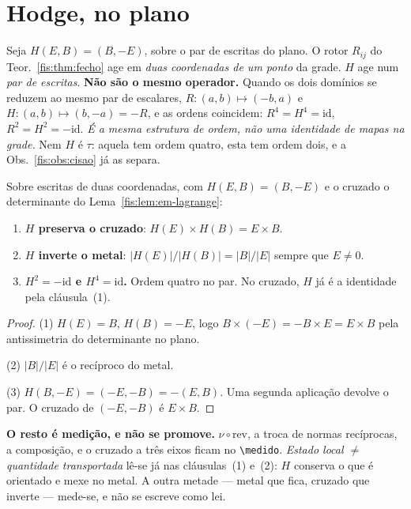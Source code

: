 \documentclass[livro.tex]{subfiles}
\begin{document}
\section{Hodge, no plano}\label{fis:em-hodge}

\noindent Seja $H(E,B)=(B,-E)$, sobre o par de escritas do plano. O rotor
$R_{ij}$ do Teor.~\ref{fis:thm:fecho} age em \emph{duas coordenadas de um
ponto} da grade. $H$ age num \emph{par de escritas}. \textbf{Não são o mesmo
operador.} Quando os dois domínios se reduzem ao mesmo par de escalares,
$R\colon(a,b)\mapsto(-b,a)$ e $H\colon(a,b)\mapsto(b,-a)=-R$, e as ordens
coincidem: $R^{4}=H^{4}=\mathrm{id}$, $R^{2}=H^{2}=-\mathrm{id}$. \emph{É a
mesma estrutura de ordem, não uma identidade de mapas na grade.} Nem $H$ é
$\tau$: aquela tem ordem quatro, esta tem ordem dois, e a
Obs.~\ref{fis:obs:cisao} já as separa.

\begin{teorema}\label{fis:thm:em-hodge}
Sobre escritas de duas coordenadas, com $H(E,B)=(B,-E)$ e o cruzado o
determinante do Lema~\ref{fis:lem:em-lagrange}:
\begin{enumerate}\itemsep3pt
\item[(1)] \textbf{$H$ preserva o cruzado}: $H(E)\times H(B)=E\times B$.
\item[(2)] \textbf{$H$ inverte o metal}: $\lvert H(E)\rvert/\lvert H(B)\rvert
=\lvert B\rvert/\lvert E\rvert$ sempre que $E\neq0$.
\item[(3)] \textbf{$H^{2}=-\mathrm{id}$ e $H^{4}=\mathrm{id}$.} Ordem quatro
no par. No cruzado, $H$ já é a identidade pela cláusula~(1).
\end{enumerate}
\end{teorema}

\begin{proof}
(1) $H(E)=B$, $H(B)=-E$, logo $B\times(-E)=-B\times E=E\times B$ pela
antissimetria do determinante no plano.

(2) $\lvert B\rvert/\lvert E\rvert$ é o recíproco do metal.

(3) $H(B,-E)=(-E,-B)=-(E,B)$. Uma segunda aplicação devolve o par. O cruzado
de $(-E,-B)$ é $E\times B$.
\end{proof}

\medskip\noindent\textbf{O resto é medição, e não se promove.}
$\nu\circ\mathrm{rev}$, a troca de normas recíprocas, a composição, e o
cruzado a três eixos ficam no \verb|\medido|. \emph{Estado local $\neq$
quantidade transportada} lê-se já nas cláusulas~(1) e~(2): $H$ conserva o que
é orientado e mexe no metal. A outra metade --- metal que fica, cruzado que
inverte --- mede-se, e não se escreve como lei.
\end{document}
